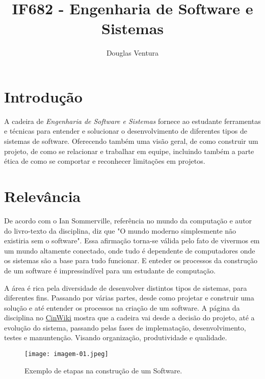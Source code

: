 \documentclass[a4paper]{article}
\title{IF682 - Engenharia de Software e Sistemas}
\author{Douglas Ventura}
\begin{document}
\maketitle
\section{Introdução}

A cadeira de \textit{Engenharia de Software e Sistemas} fornece ao estudante ferramentas e técnicas para entender e solucionar o desenvolvimento de diferentes tipos de sistemas de software. Oferecendo também uma visão geral, de como construir um projeto, de como se relacionar e trabalhar em equipe, incluindo também a parte ética de como se comportar e reconhecer limitações em projetos.

\section{Relevância}

De acordo com o Ian Sommerville, referência no mundo da computação e autor do livro-texto\cite{sommerville2011software} da disciplina, diz que "O mundo moderno simplesmente não existiria sem o software". Essa afirmação torna-se válida pelo fato de vivermos em um mundo altamente conectado, onde tudo é dependente de computadores onde os sistemas são a base para tudo funcionar. E enteder os processos da construção de um software é impressindível para um estudante de computação.

A área é rica pela diversidade de desenvolver distintos tipos de sistemas, para diferentes fins. Passando por várias partes, desde como projetar e construir uma solução e até entender os processos na criação de um software. A página da disciplina no \href{https://www.cin.ufpe.br/~pet/wiki/Engenharia_de_Software_e_Sistemas}{CinWiki} mostra que a cadeira vai desde a decisão do projeto, até a evolução do sistema, passando pelas fases de implematação, desenvolvimento, testes e manuntenção. Visando organização, produtividade e qualidade. 

\begin{figure}[h]
\centering
\texttt{[image: imagem-01.jpeg]}
\caption{\label{fig:imagem-01}Exemplo de etapas na construção de um Software.}
\end{figure}
\end{document}
